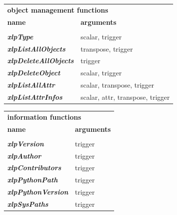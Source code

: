 \begin{figure}
\begin{minipage}[t]{.55\linewidth}
\begin{tabular}{ll}
\multicolumn{2}{l}{\textbf{\textcolor{mred}{object management functions}}} \\
\textbf{\textcolor{mblue}{name}} & \textbf{\textcolor{mblue}{arguments}}  \\
\hline\\
{\sl \bf xlpType} &  scalar, trigger\\
{\sl \bf xlpListAllObjects} & transpose, trigger \\
{\sl \bf xlpDeleteAllObjects} & trigger \\
{\sl \bf xlpDeleteObject} & scalar, trigger \\
{\sl \bf xlpListAllAttr} & scalar, transpose, trigger \\
{\sl \bf xlpListAttrInfos} & scalar, attr, transpose, trigger
\end{tabular}
\end{minipage}\hfill
\begin{minipage}[t]{.30\linewidth}
\begin{tabular}{ll}
\multicolumn{2}{l}{\textbf{\textcolor{mred}{information functions}}} \\
\textbf{\textcolor{mblue}{name}} & \textbf{\textcolor{mblue}{arguments}}  \\
\hline\\
{\sl \bf xlpVersion} & trigger \\
{\sl \bf xlpAuthor} &  trigger \\
{\sl \bf xlpContributors} & trigger \\
{\sl \bf xlpPythonPath} & trigger \\
{\sl \bf xlpPythonVersion} & trigger \\
{\sl \bf xlpSysPaths} & trigger 
\end{tabular}
\end{minipage}

\vspace{10mm}
 

\end{figure}
